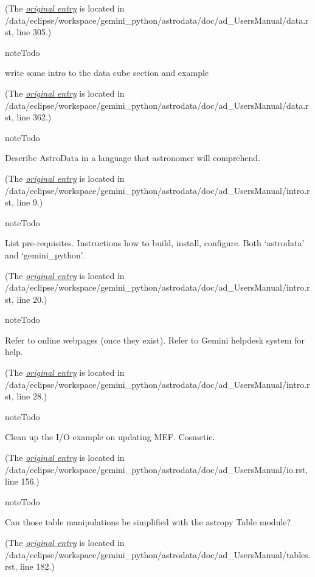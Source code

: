 \documentclass[letterpaper,10pt,english]{sphinxmanual}
\begin{document}
(The {\hyperref[data:index-0]{\emph{original entry}}} is located in  /data/eclipse/workspace/gemini\_python/astrodata/doc/ad\_UsersManual/data.rst, line 305.)

\begin{notice}{note}{Todo}

write some intro to the data cube section and example
\end{notice}

(The {\hyperref[data:index-1]{\emph{original entry}}} is located in  /data/eclipse/workspace/gemini\_python/astrodata/doc/ad\_UsersManual/data.rst, line 362.)

\begin{notice}{note}{Todo}

Describe AstroData in a language that astronomer will comprehend.
\end{notice}

(The {\hyperref[intro:index-0]{\emph{original entry}}} is located in  /data/eclipse/workspace/gemini\_python/astrodata/doc/ad\_UsersManual/intro.rst, line 9.)

\begin{notice}{note}{Todo}

List pre-requisites. Instructions how to build, install, configure. Both `astrodata' and `gemini\_python'.
\end{notice}

(The {\hyperref[intro:index-1]{\emph{original entry}}} is located in  /data/eclipse/workspace/gemini\_python/astrodata/doc/ad\_UsersManual/intro.rst, line 20.)

\begin{notice}{note}{Todo}

Refer to online webpages (once they exist).  Refer to Gemini helpdesk system for help.
\end{notice}

(The {\hyperref[intro:index-2]{\emph{original entry}}} is located in  /data/eclipse/workspace/gemini\_python/astrodata/doc/ad\_UsersManual/intro.rst, line 28.)

\begin{notice}{note}{Todo}

Clean up the I/O example on updating MEF.  Cosmetic.
\end{notice}

(The {\hyperref[io:index-0]{\emph{original entry}}} is located in  /data/eclipse/workspace/gemini\_python/astrodata/doc/ad\_UsersManual/io.rst, line 156.)

\begin{notice}{note}{Todo}

Can those table manipulations be simplified with the astropy Table module?
\end{notice}

(The {\hyperref[tables:index-0]{\emph{original entry}}} is located in  /data/eclipse/workspace/gemini\_python/astrodata/doc/ad\_UsersManual/tables.rst, line 182.)



\renewcommand{\indexname}{Index}
\printindex
\end{document}
